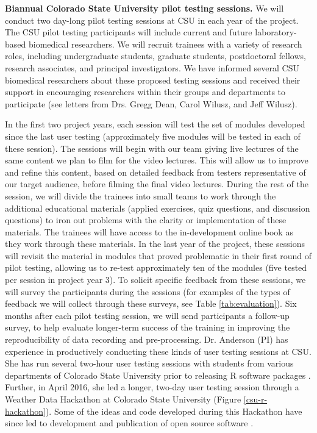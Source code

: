 \documentclass[pdftex,english,11.5pt,parskip=half]{scrartcl}
\begin{document}


\textbf{Biannual Colorado State University pilot testing sessions.}
We will conduct two day-long pilot testing sessions at CSU in each year of the
project. The CSU pilot testing participants will include current and future
laboratory-based biomedical researchers. We will recruit trainees with a variety
of research roles, including undergraduate students, graduate students,
postdoctoral fellows, research associates, and principal investigators. We have
informed several CSU biomedical researchers about these proposed testing
sessions and received their support in encouraging researchers within their
groups and departments to participate (see letters from Drs. Gregg Dean, Carol Wilusz, and Jeff Wilusz). 

In the first two project years, each session will test the set of modules
developed since the last user testing (approximately five modules will be tested
in each of these session). The sessions will begin with our team giving live
lectures of the same content we plan to film for the video lectures. This will allow us to improve and refine this content, based on
detailed feedback from testers representative of our target audience, before
filming the final video lectures. During the rest of the session, we will divide
the trainees into small teams to work through the additional educational
materials (applied exercises, quiz questions, and discussion questions) to iron
out problems with the clarity or implementation of these materials. The trainees
will have access to the in-development online book as they work through these
materials. In the last year of the project, these sessions will revisit the material
in modules that proved problematic in their first round of pilot testing, allowing us
to re-test approximately ten of the modules (five tested per session in project year 3).
To solicit specific feedback from these sessions, we will survey the participants during the sessions (for examples of the types of feedback we will collect through these surveys, see Table \ref*{tab:evaluation}). Six months after each pilot testing session, we will send participants a follow-up survey, to help evaluate longer-term success of the training in improving the reproducibility of data recording and pre-processing. Dr. Anderson (PI) has experience in productively conducting these kinds of user
testing sessions at CSU. She has run several two-hour user testing sessions with
students from various departments of Colorado State University prior to
releasing R software packages \cite{futureheatwaves, countyweather}. Further, in
April 2016, she led a longer, two-day user testing session through a Weather
Data Hackathon at Colorado State University (Figure \ref*{csu-r-hackathon}).
Some of the ideas and code developed during this Hackathon have
since led to development and publication of open source software
\cite{countyfloods, noaastormevents}.
\end{document}
